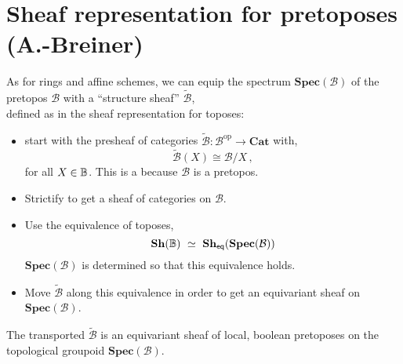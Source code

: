 \documentclass[lambek.tex]{subfiles}
\begin{document}
\section{Sheaf representation for pretoposes (A.-Breiner)}

As for rings and affine schemes, we can equip the spectrum $\mathbf{Spec}(\mathcal{B})$ of the pretopos $\mathcal{B}$ with a ``structure sheaf'' $\tilde{\mathcal{B}}$,\\
  defined as in the sheaf representation for toposes: 
\begin{itemize}
\item start with the presheaf of categories $\tilde{\mathcal{B}} : \mathcal{B}^{\mathrm{op}}\to\mathbf{Cat}$ with,
\[
\tilde{\mathcal{B}}(X) \cong \mathcal{B}/X\,,
\]
for all $X\in \mathbb{B}$. This is a  because $\mathcal{B}$ is a pretopos.
 
\item Strictify to get a sheaf of categories on $\mathcal{B}$. 

\item Use the equivalence of toposes,
\[
\mathbf{Sh}(\B)\ \simeq\ \mathbf{Sh}_{\mathsf{eq}}(\mathbf{Spec}(\mathcal{B}))
\]
$\mathbf{Spec}(\mathcal{B})$ is determined so that this equivalence holds.

\item Move $\tilde{\mathcal{B}}$ along this equivalence in order to get an equivariant sheaf on $\mathbf{Spec}(\mathcal{B})$.
\end{itemize}


The transported $\tilde{\mathcal{B}}$  is an equivariant sheaf of local, boolean pretoposes on the topological groupoid $\mathbf{Spec}(\mathcal{B})$.
\end{document}
